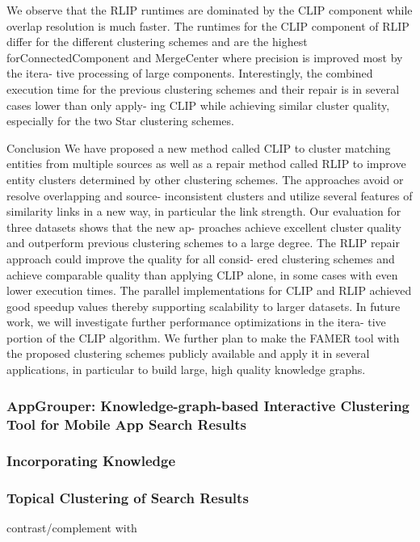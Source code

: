 \documentclass[runningheads]{llncs}
\begin{document}
We observe that the RLIP runtimes are dominated by the CLIP component while overlap resolution is much faster. The runtimes for the CLIP component of RLIP differ for the different clustering schemes and are the highest forConnectedComponent and MergeCenter where precision is improved most by the itera- tive processing of large components. Interestingly, the combined execution time for the previous clustering schemes and their repair is in several cases lower than only apply- ing CLIP while achieving similar cluster quality, especially for the two Star clustering schemes.

Conclusion
We have proposed a new method called CLIP to cluster matching entities from multiple sources as well as a repair method called RLIP to improve entity clusters determined by other clustering schemes. The approaches avoid or resolve overlapping and source- inconsistent clusters and utilize several features of similarity links in a new way, in particular the link strength. Our evaluation for three datasets shows that the new ap- proaches achieve excellent cluster quality and outperform previous clustering schemes to a large degree. The RLIP repair approach could improve the quality for all consid- ered clustering schemes and achieve comparable quality than applying CLIP alone, in some cases with even lower execution times. The parallel implementations for CLIP and RLIP achieved good speedup values thereby supporting scalability to larger datasets.
In future work, we will investigate further performance optimizations in the itera- tive portion of the CLIP algorithm. We further plan to make the FAMER tool with the proposed clustering schemes publicly available and apply it in several applications, in particular to build large, high quality knowledge graphs.


\subsubsection{AppGrouper: Knowledge-graph-based Interactive Clustering Tool for Mobile App Search Results} \cite{Chang}

\subsubsection{Incorporating Knowledge }


\subsubsection{Topical Clustering of Search Results}
\cite{Scaiella} contrast/complement with \cite{Schuhmacher}
\end{document}
